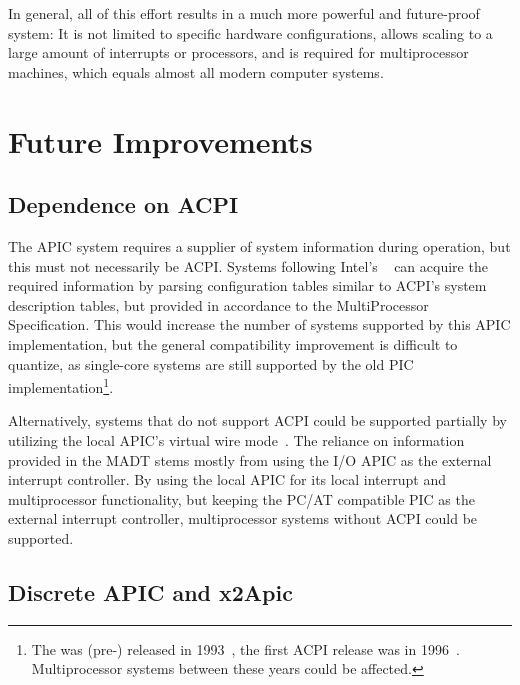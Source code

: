 In general, all of this effort results in a much more powerful and future-proof system: It is not limited to specific hardware configurations, allows scaling to a large amount of interrupts or processors, and is required for multiprocessor machines, which equals almost all modern computer systems.

\section{Future Improvements}
\label{sec:futureimprov}

\subsection{Dependence on ACPI}
\label{subsec:acpidependance}

The APIC system requires a supplier of system information during operation, but this must not necessarily be ACPI\@.
Systems following Intel's ~\autocite{mpspec} can acquire the required information by parsing configuration tables similar to ACPI's system description tables, but provided in accordance to the MultiProcessor Specification.
This would increase the number of systems supported by this APIC implementation, but the general compatibility improvement is difficult to quantize, as single-core systems are still supported by the old PIC implementation\footnote{
  The  was (pre-) released in 1993~\autocite{mpspecpre}, the first ACPI release was in 1996~\autocite{acpipre}.
  Multiprocessor systems between these years could be affected.}.

Alternatively, systems that do not support ACPI could be supported partially by utilizing the local APIC's virtual wire mode~\autocite[sec.~3.6.2.2]{mpspec}.
The reliance on information provided in the MADT stems mostly from using the I/O APIC as the external interrupt controller.
By using the local APIC for its local interrupt and multiprocessor functionality, but keeping the PC/AT compatible PIC as the external interrupt controller, multiprocessor systems without ACPI could be supported.

\subsection{Discrete APIC and x2Apic}
\label{subsec:discretex2}

